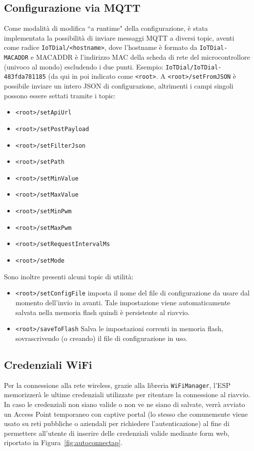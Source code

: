 \documentclass[12pt,a4paper]{report}
\begin{document}
\subsection{Configurazione via MQTT}
Come modalità di modifica ``a runtime" della configurazione, è stata implementata la possibilità di inviare messaggi MQTT a diversi
topic, aventi come radice \texttt{IoTDial/<hostname>}, dove l'hostname è formato da \texttt{IoTDial-MACADDR} e MACADDR è
l'indirizzo MAC della scheda di rete del microcontrollore (univoco al mondo) escludendo i due punti. Esempio: 
\texttt{IoTDial/IoTDial-483fda781185} (da qui in poi indicato come \texttt{<root>}.
A \texttt{<root>/setFromJSON} è possibile inviare un intero JSON di configurazione, altrimenti i campi singoli possono essere
settati tramite i topic:
\begin{itemize}
  \item \texttt{<root>/setApiUrl}
  \item \texttt{<root>/setPostPayload}
  \item \texttt{<root>/setFilterJson}
  \item \texttt{<root>/setPath}
  \item \texttt{<root>/setMinValue}
  \item \texttt{<root>/setMaxValue}
  \item \texttt{<root>/setMinPwm}
  \item \texttt{<root>/setMaxPwm}
  \item \texttt{<root>/setRequestIntervalMs}
  \item \texttt{<root>/setMode}
\end{itemize}
\noindent Sono inoltre presenti alcuni topic di utilità:
\begin{itemize}
  \item \texttt{<root>/setConfigFile} imposta il nome del file di configurazione da usare dal momento dell'invio in avanti. Tale
		impostazione viene automaticamente salvata nella memoria flash quindi è persistente al riavvio.
  \item \texttt{<root>/saveToFlash} Salva le impostazioni correnti in memoria flash, sovrascrivendo (o creando) il file di configurazione
		in uso.
\end{itemize}

\subsection{Credenziali WiFi}
Per la connessione alla rete wireless, grazie alla libreria \texttt{WiFiManager}, l'ESP memorizzerà le ultime credenziali utilizzate
per ritentare la connessione al riavvio. In caso le credenziali non siano valide o non ve ne siano di salvate, verrà avviato un
Access Point temporaneo con captive portal (lo stesso che comunemente viene usato su reti pubbliche o aziendali per richiedere
l'autenticazione) al fine di permettere all'utente di inserire delle credenziali valide mediante form web, riportato in
Figura~\ref{fig:autoconnectap}.
\end{document}
